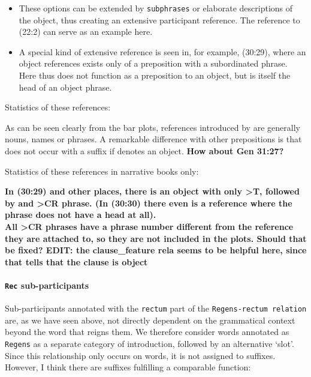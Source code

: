 \documentclass{report}
\newcommand{\mi}[1]{\lstinline{#1}}
\newcommand{\hebr}[1]{\cjRL{#1}}
\begin{document}
\begin{itemize}
\item These options can be extended by \mi{subphrases} or elaborate descriptions of the object, thus creating an extensive participant reference. The reference to (22:2) can serve as an example here.
\item A special kind of extensive reference is seen in, for example, (30:29), where an object references exists only of a preposition \hebr{>T} with a subordinated \hebr{>CR} phrase. Here \hebr{>T} thus does not function as a preposition to an object, but is itself the head of an object phrase.
\end{itemize}

Statistics of these references: \\
\noindent
\begin{minipage}{.5\textwidth}

\end{minipage}
\begin{minipage}{.5\textwidth}
\centering

\end{minipage}
As can be seen clearly from the bar plots, references introduced by \hebr{>T} are generally nouns, names or phrases. A remarkable difference with other prepositions is that \hebr{>T} does not occur with a suffix if \hebr{>T} denotes an object. \textbf{How about Gen 31:27?}

Statistics of these references in narrative books only: \\
\noindent
\begin{minipage}{.5\textwidth}

\end{minipage}
\begin{minipage}{.5\textwidth}
\centering

\end{minipage}

\textbf{In (30:29) and other places, there is an object with only >T, followed by and >CR phrase. (In (30:30) there even is a reference where the \hebr{>CR} phrase does not have a head at all).}\\
\textbf{All >CR phrases have a phrase number different from the reference they are attached to, so they are not included in the plots. Should that be fixed? EDIT: the clause\_feature rela seems to be helpful here, since that tells that the clause is object}

\paragraph{\mi{Rec} sub-participants}
Sub-participants annotated with the \mi{rectum} part of the \mi{Regens-rectum relation} are, as we have seen above, not directly dependent on the grammatical context beyond the word that reigns them. We therefore consider words annotated as \mi{Regens} as a separate category of introduction, followed by an alternative `slot'. Since this relationship only occurs on words, it is not assigned to suffixes. However, I think there are suffixes fulfilling a comparable function:
\end{document}
